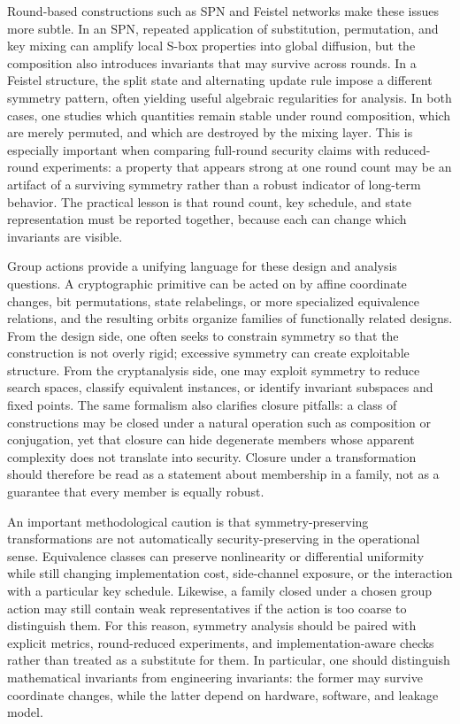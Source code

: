 \documentclass[11pt]{article}
\begin{document}
Round-based constructions such as SPN and Feistel networks make these issues more subtle. In an SPN, repeated application of substitution, permutation, and key mixing can amplify local S-box properties into global diffusion, but the composition also introduces invariants that may survive across rounds. In a Feistel structure, the split state and alternating update rule impose a different symmetry pattern, often yielding useful algebraic regularities for analysis. In both cases, one studies which quantities remain stable under round composition, which are merely permuted, and which are destroyed by the mixing layer. This is especially important when comparing full-round security claims with reduced-round experiments: a property that appears strong at one round count may be an artifact of a surviving symmetry rather than a robust indicator of long-term behavior. The practical lesson is that round count, key schedule, and state representation must be reported together, because each can change which invariants are visible.

Group actions provide a unifying language for these design and analysis questions. A cryptographic primitive can be acted on by affine coordinate changes, bit permutations, state relabelings, or more specialized equivalence relations, and the resulting orbits organize families of functionally related designs. From the design side, one often seeks to constrain symmetry so that the construction is not overly rigid; excessive symmetry can create exploitable structure. From the cryptanalysis side, one may exploit symmetry to reduce search spaces, classify equivalent instances, or identify invariant subspaces and fixed points. The same formalism also clarifies closure pitfalls: a class of constructions may be closed under a natural operation such as composition or conjugation, yet that closure can hide degenerate members whose apparent complexity does not translate into security. Closure under a transformation should therefore be read as a statement about membership in a family, not as a guarantee that every member is equally robust.

An important methodological caution is that symmetry-preserving transformations are not automatically security-preserving in the operational sense. Equivalence classes can preserve nonlinearity or differential uniformity while still changing implementation cost, side-channel exposure, or the interaction with a particular key schedule. Likewise, a family closed under a chosen group action may still contain weak representatives if the action is too coarse to distinguish them. For this reason, symmetry analysis should be paired with explicit metrics, round-reduced experiments, and implementation-aware checks rather than treated as a substitute for them. In particular, one should distinguish mathematical invariants from engineering invariants: the former may survive coordinate changes, while the latter depend on hardware, software, and leakage model.
\end{document}
